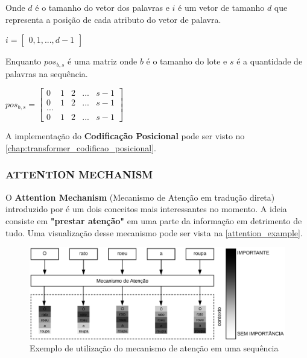 Onde $d$ é o tamanho do vetor dos palavras e $i$ é um vetor de tamanho $d$ que representa a posição de cada atributo do vetor de palavra.

\begin{center}
    $i = \begin{bmatrix} 0, 1, ..., d-1 \end{bmatrix}$
\end{center}

Enquanto $pos_{b,s}$ é uma matriz onde $b$ é o tamanho do lote e $s$ é a quantidade de palavras na sequência.

\begin{center}
    $pos_{b, s} = \begin{bmatrix}
    0 & 1 & 2 & ... & s-1 \\
    0 & 1 & 2 & ... & s-1 \\
    ... \\
    0 & 1 & 2 & ... & s-1
    \end{bmatrix}$
\end{center}

A implementação do \textbf{Codificação Posicional} pode ser visto no \autoref{chap:transformer_codificao_posicional}.


\subsubsection{ATTENTION MECHANISM}

O \textbf{Attention Mechanism} (Mecanismo de Atenção em tradução direta) introduzido por \cite{attention} é um dois conceitos mais interessantes no momento. A ideia consiste em \textbf{"prestar atenção"} em uma parte da informação em detrimento de tudo. Uma visualização desse mecanismo pode ser vista na \autoref{attention_example}.

\begin{figure}[h]
	\caption{\label{attention_example} Exemplo de utilização do mecanismo de atenção em uma sequência}
	\begin{center}
	    \includegraphics[width=\textwidth]{artigo/recursos/imagens/attention_example.png}
	\end{center}
\end{figure}

